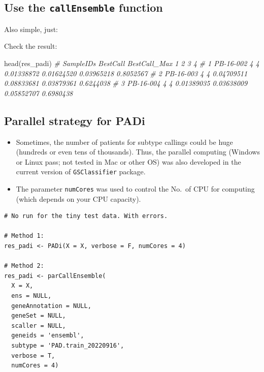 \documentclass[
  12pt,
]{book}
\newenvironment{Shaded}{\begin{snugshade}}{\end{snugshade}}
\newcommand{\CommentTok}[1]{\textcolor[rgb]{0.56,0.35,0.01}{\textit{#1}}}
\newcommand{\FunctionTok}[1]{\textcolor[rgb]{0.00,0.00,0.00}{#1}}
\newcommand{\NormalTok}[1]{#1}
\begin{document}
\hypertarget{use-the-callensemble-function}{%
\subsection{\texorpdfstring{Use the \texttt{callEnsemble} function}{Use the callEnsemble function}}\label{use-the-callensemble-function}}

Also simple, just:

Check the result:

\begin{Shaded}
\begin{Highlighting}[]
\FunctionTok{head}\NormalTok{(res\_padi)}
\CommentTok{\#   SampleIDs BestCall BestCall\_Max          1          2          3         4}
\CommentTok{\# 1 PB{-}16{-}002        4            4 0.01338872 0.01624520 0.03965218 0.8052567}
\CommentTok{\# 2 PB{-}16{-}003        4            4 0.04709511 0.08833681 0.03879361 0.6244038}
\CommentTok{\# 3 PB{-}16{-}004        4            4 0.01389035 0.03638009 0.05852707 0.6980438}
\end{Highlighting}
\end{Shaded}

\hypertarget{parallel-strategy-for-padi}{%
\subsection{Parallel strategy for PADi}\label{parallel-strategy-for-padi}}

\begin{itemize}
\item
  Sometimes, the number of patients for subtype callings could be huge (hundreds or even tens of thousands). Thus, the parallel computing (Windows or Linux pass; not tested in Mac or other OS) was also developed in the current version of \texttt{GSClassifier} package.
\item
  The parameter \texttt{numCores} was used to control the No.~of CPU for computing (which depends on your CPU capacity).
\end{itemize}

\begin{verbatim}
# No run for the tiny test data. With errors.

# Method 1:
res_padi <- PADi(X = X, verbose = F, numCores = 4)

# Method 2: 
res_padi <- parCallEnsemble(
  X = X,
  ens = NULL,
  geneAnnotation = NULL,
  geneSet = NULL,
  scaller = NULL,
  geneids = 'ensembl',
  subtype = 'PAD.train_20220916',
  verbose = T,
  numCores = 4)
\end{verbatim}
\end{document}
